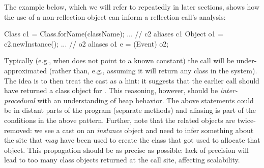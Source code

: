 
The example below, which we will refer to repeatedly in later
sections, shows how the use of a non-reflection object can inform a
reflection call's analysis:

\begin{javacodelinum}
Class c1 = Class.forName(className);
...      // c2 aliases c1
Object o1 = c2.newInstance(); 
...      // o2 aliases o1
e = (Event) o2; 
\end{javacodelinum}

Typically (e.g., when  does not point to a known
constant) the  call will be under-approximated (rather
than, e.g., assuming it will return any class in the system). The idea
is to then treat the cast as a hint: it suggests that the earlier
 call should have returned a class object for
. This reasoning, however, should be \emph{inter-procedural}
with an understanding of heap behavior.  The above statements could be
in distant parts of the program (separate methods) and aliasing is
part of the conditions in the above pattern.  Further, note that the
related objects are twice-removed: we see a cast on an \emph{instance}
object and need to infer something about the  site that
\emph{may} have been used to create the class that got used to
allocate that object. This propagation should be as precise as
possible: lack of precision will lead to too many class objects
returned at the  call site, affecting scalability.

